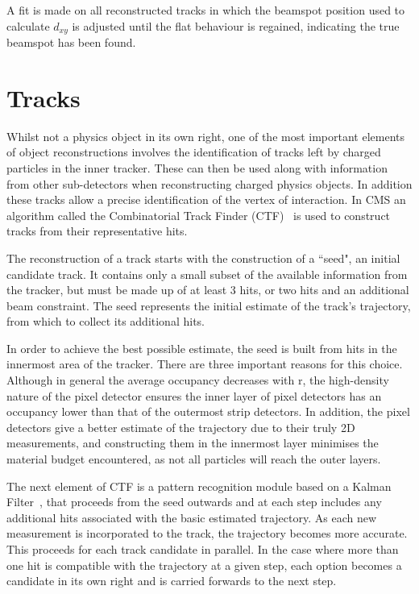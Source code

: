  A fit is made on all reconstructed tracks in which the beamspot position used to calculate $d_{xy}$ is adjusted until the flat behaviour is regained, indicating the true beamspot has been found. 
 
 
 
\section{Tracks}
\label{sec:trk}

Whilst not a physics object in its own right, one of the most important elements of object reconstructions involves the identification of tracks left by charged particles in the inner tracker. These can then be used along with information from other sub-detectors when reconstructing charged physics objects. In addition these tracks allow a precise identification of the vertex of interaction. In CMS an algorithm called the Combinatorial Track Finder (CTF)~\cite{CTF} is used to construct tracks from their representative hits. 

The reconstruction of a track starts with the construction of a ``seed", an initial candidate track. It contains only a small subset of the available information from the tracker, but must be made up of at least 3 hits, or two hits and an additional beam constraint. The seed represents the initial estimate of the track's trajectory, from which to collect its additional hits. 

In order to achieve the best possible estimate, the seed is built from hits in the innermost area of the tracker. There are three important reasons for this choice. Although in general the average occupancy decreases with r, the high-density nature of the pixel detector ensures the inner layer of pixel detectors has an occupancy lower than that of the outermost strip detectors. In addition, the pixel detectors give a better estimate of the trajectory due to their truly 2D measurements, and constructing them in the innermost layer minimises the material budget encountered, as not all particles will reach the outer layers. 

The next element of CTF is a pattern recognition module based on a Kalman Filter~\cite{Kalman}, that proceeds from the seed outwards and at each step includes any additional hits associated with the basic estimated trajectory. As each new measurement is incorporated to the track, the trajectory becomes more accurate. This proceeds for each track candidate in parallel. In the case where more than one hit is compatible with the trajectory at a given step, each option becomes a candidate in its own right and is carried forwards to the next step.   

